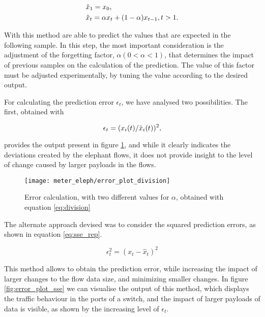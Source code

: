 \begin{equation}
    \centering
        \begin {split}
            &\hat{x}_1 = x_0, \\
            &\hat{x}_t = \alpha x_{t} + (1-\alpha)x_{t-1}, t > 1.
        \end {split}
    \label{eq:exp_smooth_rep}
\end{equation}

\par With this method are able to predict the values that are expected in the following sample. In this step, the most important consideration is the adjustment of 
the forgetting factor, $\alpha (0 < \alpha < 1)$, that determines the impact of previous samples on the calculation of the prediction. The value of this factor must
be adjusted experimentally, by tuning the value according to the desired output.

\par For calculating the prediction error $\epsilon_t$, we have analysed two possibilities. The first, obtained with

\begin{equation}
    \centering
    \label{eq:division}
    \epsilon_t = (x_i(t)/\hat{x}_i(t))^2,
\end{equation}

\par provides the output present in figure \ref{fig:error_plot_division}, and while it clearly indicates the deviations created by the elephant flows, it 
does not provide insight to the level of change caused by larger payloads in the flows.

\begin{figure}[H]
    \texttt{[image: meter\_eleph/error\_plot\_division]}
    \caption{Error calculation, with two different values for $\alpha$, obtained with equation \ref{eq:division}}
    \label{fig:error_plot_division}
\end{figure}

\par The alternate approach devised was to consider the squared prediction errors, as shown in equation \ref{eq:sse_rep}.

\begin {equation} 
    \label{eq:sse_rep}
    \epsilon_t^2 = (x_t-\hat{x}_{t})^2 
\end {equation}

This method allows to obtain the prediction error, while increasing the impact of larger changes to the flow data size, and minimizing smaller changes. In figure
\ref{fig:error_plot_sse} we can visualise the output of this method, which displays the traffic behaviour in the ports of a switch, and the impact of larger payloads
of data is visible, as shown by the increasing level of $\epsilon_t$.

